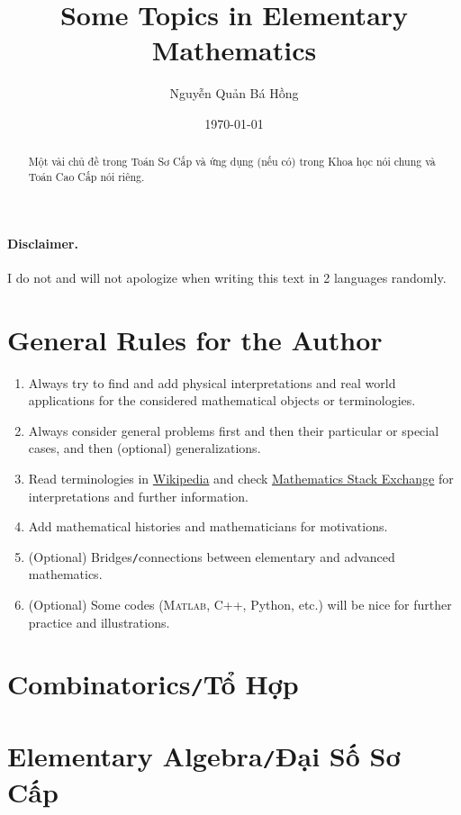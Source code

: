 \documentclass{article}
\title{Some Topics in Elementary Mathematics}
\author{Nguyễn Quản Bá Hồng}
\date{\today}
\numberwithin{equation}{section}
\begin{document}
\maketitle
\begin{abstract}
	Một vài chủ đề trong Toán Sơ Cấp và ứng dụng (nếu có) trong Khoa học nói chung và Toán Cao Cấp nói riêng.
\end{abstract}
\tableofcontents


\paragraph{Disclaimer.} I do not and will not apologize when writing this text in 2 languages randomly.

\section*{General Rules for the Author}
\begin{enumerate}
	\item Always try to find and add physical interpretations and real world applications for the considered mathematical objects or terminologies.
	\item Always consider general problems first and then their particular or special cases, and then (optional) generalizations.
	\item Read terminologies in \href{https://www.wikipedia.org/}{Wikipedia} and check \href{https://math.stackexchange.com/}{Mathematics Stack Exchange} for interpretations and further information.
	\item Add mathematical histories and mathematicians for motivations.
	\item (Optional) Bridges\texttt{/}connections between elementary and advanced mathematics.
	\item (Optional) Some codes (\textsc{Matlab}, C++, Python, etc.) will be nice for further practice and illustrations.
\end{enumerate}

\section{Combinatorics\texttt{/}Tổ Hợp}

\section{Elementary Algebra\texttt{/}Đại Số Sơ Cấp}
\end{document}
